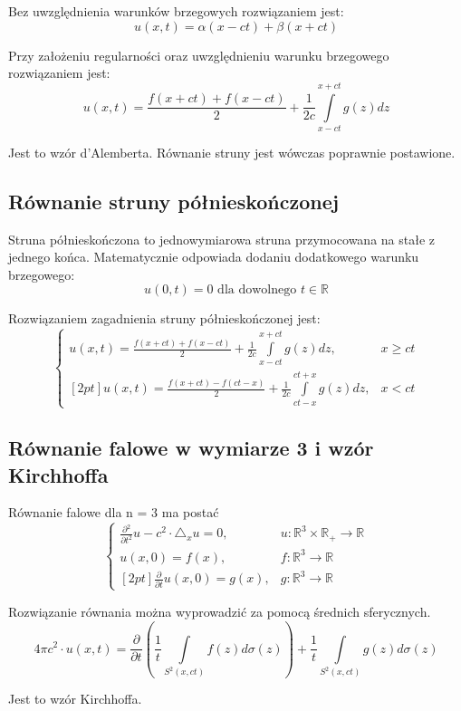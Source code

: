 \documentclass{article}
\begin{document}
Bez uwzględnienia warunków brzegowych rozwiązaniem jest: 
$$ u(x,t)=\alpha (x-ct)+\beta (x+ct) $$

Przy założeniu regularności oraz uwzględnieniu warunku brzegowego rozwiązaniem jest: 
\[ u(x,t)={\frac {f(x+ct)+f(x-ct)}{2}}+{\frac {1}{2c}}\int \limits _{x-ct}^{x+ct}{g(z)dz} \]

Jest to wzór d’Alemberta. Równanie struny jest wówczas poprawnie postawione. 

\subsection*{Równanie struny półnieskończonej}
Struna półnieskończona to jednowymiarowa struna przymocowana na stałe z jednego końca. Matematycznie odpowiada dodaniu dodatkowego warunku brzegowego: 
$$ u(0,t)=0 {\text{ dla  dowolnego }} t\in \mathbb {R} $$

Rozwiązaniem zagadnienia struny półnieskończonej jest: 
\begin{equation*}
{\begin{cases}u(x,t)={\frac {f(x+ct)+f(x-ct)}{2}}+{\frac {1}{2c}}\int \limits _{x-ct}^{x+ct}{g(z)dz},&x\geq {}ct\\{[2pt]}u(x,t)={\frac {f(x+ct)-f(ct-x)}{2}}+{\frac {1}{2c}}\int \limits _{ct-x}^{ct+x}{g(z)dz},&x<ct\end{cases}}
\end{equation*}

\subsection*{Równanie falowe w wymiarze 3 i wzór Kirchhoffa}
Równanie falowe dla n = 3 ma postać
\[ {\begin{cases}{\frac {\partial {}^{2}}{\partial t^{2}}}u-c^{2}\cdot \triangle _{x}u=0,&u:\mathbb {R} ^{3}\times \mathbb {R} _{+}\to {}\mathbb {R} \\u(x,0)=f(x),&f:\mathbb {R} ^{3}\to \mathbb {R} \\{[2pt]}{\frac {\partial {}}{\partial t}}u(x,0)=g(x),&g:\mathbb {R} ^{3}\to \mathbb {R} \end{cases}} \]

Rozwiązanie równania można wyprowadzić za pomocą średnich sferycznych. 
$$ 4\pi {}c^{2}{}\cdot {}u(x,t)={\frac {\partial }{\partial t}}\left({\frac {1}{t}}\int \limits _{S^{2}(x,ct)}{f(z)d\sigma (z)}\right)+{\frac {1}{t}}\int \limits _{S^{2}(x,ct)}{g(z)d\sigma (z)} $$

Jest to wzór Kirchhoffa. 
\end{document}
